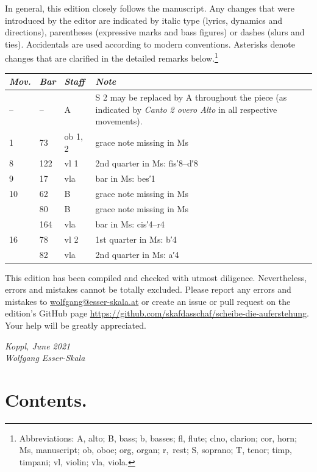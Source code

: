\documentclass[parskip=full]{scrreprt}
\begin{document}
In general, this edition closely follows the manuscript. Any changes that were introduced by the editor are indicated by italic type (lyrics, dynamics and directions), parentheses (expressive marks and bass figures) or dashes (slurs and ties). Accidentals are used according to modern conventions. Asterisks denote changes that are clarified in the detailed remarks below.\footnote{Abbreviations: A, alto; B, bass; b, basses; fl, flute; clno, clarion; cor, horn; Ms, manuscript; ob, oboe; org, organ; r,~rest; S, soprano; T, tenor; timp, timpani; vl, violin; vla, viola.}

\bigskip

\begin{longtable}{lll L{10cm}}
  \toprule
  \itshape Mov. & \itshape Bar & \itshape Staff & \itshape Note \\
  \midrule \endhead
  – & –  & A       & S 2 may be replaced by A throughout the piece (as indicated by \textit{Canto 2 overo Alto} in all respective movements). \\
  1  & 73  & ob 1, 2 & grace note missing in Ms \\
  8  & 122 & vl 1    & 2nd quarter in Ms: fis′8–d′8 \\
  9  & 17  & vla     & bar in Ms: bes′1 \\
  10 & 62  & B       & grace note missing in Ms \\
     & 80  & B       & grace note missing in Ms \\
     & 164 & vla     & bar in Ms: cis′4–r4 \\
  16 & 78  & vl 2    & 1st quarter in Ms: b′4 \\
     & 82  & vla     & 2nd quarter in Ms: a′4 \\
  \bottomrule
\end{longtable}


This edition has been compiled and checked with utmost diligence. Nevertheless, errors and mistakes cannot be totally excluded. Please report any errors and mistakes to \url{wolfgang@esser-skala.at} or create an issue or pull request on the edition’s GitHub page \url{https://github.com/skafdasschaf/scheibe-die-auferstehung}. Your help will be greatly appreciated.

\bigskip
\textit{Koppl, June 2021\\
Wolfgang Esser-Skala}

\cleardoublepage
\chapter*{Contents.}
\end{document}
